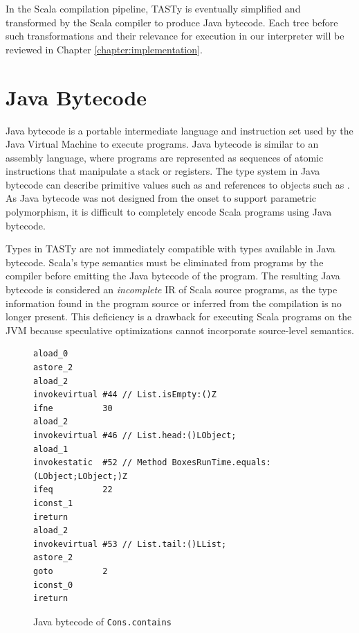In the Scala compilation pipeline, TASTy is eventually simplified and transformed by the Scala compiler to produce Java bytecode. 
Each tree before such transformations and their relevance for execution in our interpreter will be reviewed in Chapter \ref{chapter:implementation}.

\section{Java Bytecode}

Java bytecode is a portable intermediate language and instruction set used by the Java Virtual Machine to execute programs.
Java bytecode is similar to an assembly language, where programs are represented as sequences of atomic instructions that manipulate a stack or registers.
The type system in Java bytecode can describe primitive values such as  and references to objects such as .
As Java bytecode was not designed from the onset to support parametric polymorphism, it is difficult to completely encode Scala programs using Java bytecode.

Types in TASTy are not immediately compatible with types available in Java bytecode.
Scala's type semantics must be eliminated from programs by the compiler before emitting the Java bytecode of the program.
The resulting Java bytecode is considered an \textit{incomplete} IR of Scala source programs, as the type information found in the program source or inferred from the compilation is no longer present.
This deficiency is a drawback for executing Scala programs on the JVM because speculative optimizations cannot incorporate source-level semantics.

\begin{figure}[!htb]
\begin{verbatim}
aload_0
astore_2
aload_2
invokevirtual #44 // List.isEmpty:()Z
ifne          30
aload_2
invokevirtual #46 // List.head:()LObject;
aload_1
invokestatic  #52 // Method BoxesRunTime.equals:(LObject;LObject;)Z
ifeq          22
iconst_1
ireturn
aload_2
invokevirtual #53 // List.tail:()LList;
astore_2
goto          2
iconst_0
ireturn
\end{verbatim}
\caption{Java bytecode of \texttt{Cons.contains}}
\label{example:contains-bytecode}
\end{figure}

